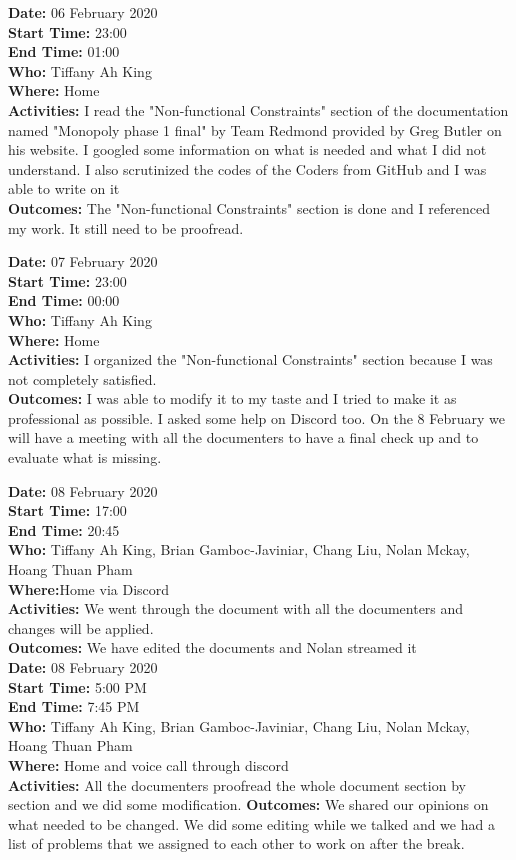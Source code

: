 \documentclass[12pt]{article}
\begin{document}
{\bf Date:} 06 February 2020\\
{\bf Start Time:} 23:00\\
{\bf End Time:} 01:00\\
{\bf Who:} Tiffany Ah King\\
{\bf Where:} Home\\
{\bf Activities:} I read the "Non-functional Constraints" section of the documentation named "Monopoly phase 1 final" by Team Redmond provided by Greg Butler on his website. I googled some information on what is needed and what I did not understand. I also scrutinized the codes of the Coders from GitHub and I was able to write on it \\
{\bf Outcomes:} The "Non-functional Constraints" section is done and I referenced my work. It still need to be proofread.

{\bf Date:} 07 February 2020\\
{\bf Start Time:} 23:00\\
{\bf End Time:} 00:00 \\
{\bf Who:} Tiffany Ah King\\
{\bf Where:} Home\\
{\bf Activities:} I organized the "Non-functional Constraints" section  because I was not completely satisfied. \\
{\bf Outcomes:} I was able to modify it to my taste and I tried to make it as professional as possible. I asked some help on Discord too. On the 8 February we will have a meeting with all the documenters to have a final check up and to evaluate what is missing.

{\bf Date:} 08 February 2020\\
{\bf Start Time:} 17:00\\
{\bf End Time:} 20:45\\
{\bf Who:} Tiffany Ah King, Brian Gamboc-Javiniar,
Chang Liu, Nolan Mckay, Hoang Thuan Pham\\
{\bf Where:}Home via Discord\\
{\bf Activities:} We went through the document with all the documenters and changes will be applied. \\
{\bf Outcomes:} We have edited the documents and Nolan streamed it\\


{\bf Date:} 08 February 2020\\
{\bf Start Time:} 5:00 PM\\
{\bf End Time:} 7:45 PM \\
{\bf Who:} Tiffany Ah King, Brian Gamboc-Javiniar, Chang Liu, Nolan Mckay, Hoang Thuan Pham\\
{\bf Where:} Home and voice call through discord \\
{\bf Activities:} All the documenters proofread the whole document section by section and we did some modification.
{\bf Outcomes:} We shared our opinions on what needed to be changed. We did some editing while we talked and we had a list of problems that we assigned to each other to work on after the break.\\
\end{document}
